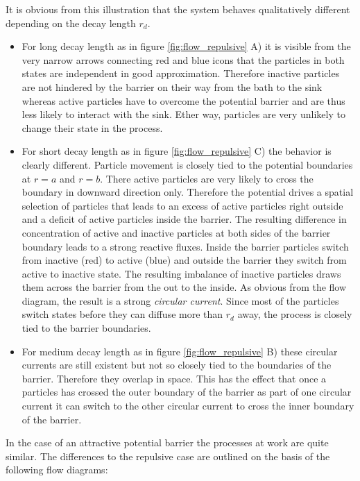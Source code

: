 It is obvious from this illustration that the system behaves qualitatively different depending on the decay length $r_d$.
\begin{itemize}
    \item For long decay length as in figure \ref{fig:flow_repulsive} A) it is visible from the very narrow arrows connecting red and blue icons that the particles in both states are independent in good approximation. Therefore inactive particles are not hindered by the barrier on their way from the bath to the sink whereas active particles have to overcome the potential barrier and are thus less likely to interact with the sink. Ether way, particles are very unlikely to change their state in the process. 
    \item For short decay length as in figure \ref{fig:flow_repulsive} C) the behavior is clearly different. Particle movement is closely tied to the potential boundaries at $r=a$ and $r=b$. There active particles are very likely to cross the boundary in downward direction only. Therefore the potential drives a spatial selection of particles that leads to an excess of active particles right outside and a deficit of active particles inside the barrier. The resulting difference in concentration of active and inactive particles at both sides of the barrier boundary leads to a strong reactive fluxes. Inside the barrier particles switch from inactive (red) to active (blue) and outside the barrier they switch from active to inactive state. The resulting imbalance of inactive particles draws them across the barrier from the out to the inside. As obvious from the flow diagram, the result is a strong \emph{circular current}. Since most of the particles switch states before they can diffuse more than $r_d$ away, the process is closely tied to the barrier boundaries. 
    \item For medium decay length as in figure \ref{fig:flow_repulsive} B) these circular currents are still existent but not so closely tied to the boundaries of the barrier. Therefore they overlap in space. This has the effect that once a particles has crossed the outer boundary of the barrier as part of one circular current it can switch to the other circular current to cross the inner boundary of the barrier. 
\end{itemize}
In the case of an attractive potential barrier the processes at work are quite similar. The differences to the repulsive case are outlined on the basis of the following flow diagrams: \vspace{-.5 cm} \\
